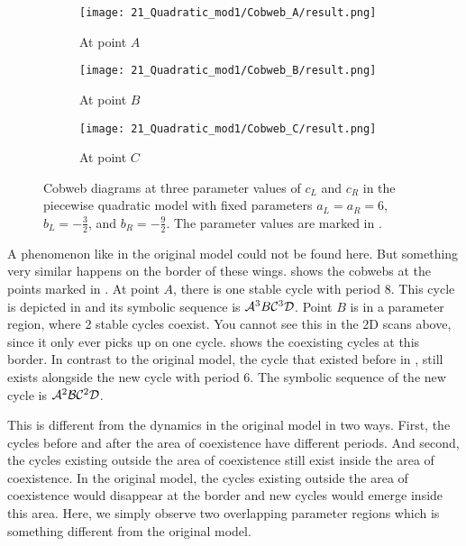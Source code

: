 \begin{figure}
	\centering
	\begin{subfigure}{0.3\textwidth}
		\centering
		\texttt{[image: 21\_Quadratic\_mod1/Cobweb\_A/result.png]}
		\caption{At point $A$}
		\label{fig:setup.quad.even.cobweb.A}
	\end{subfigure}
	\begin{subfigure}{0.3\textwidth}
		\centering
		\texttt{[image: 21\_Quadratic\_mod1/Cobweb\_B/result.png]}
		\caption{At point $B$}
		\label{fig:setup.quad.even.cobweb.B}
	\end{subfigure}
	\begin{subfigure}{0.3\textwidth}
		\centering
		\texttt{[image: 21\_Quadratic\_mod1/Cobweb\_C/result.png]}
		\caption{At point $C$}
		\label{fig:setup.quad.even.cobweb.C}
	\end{subfigure}
	\caption[Cobwebs of the even quadratic model]{
		Cobweb diagrams at three parameter values of $c_L$ and $c_R$ in the piecewise quadratic model with fixed parameters $a_L = a_R = 6$, $b_L = -\frac{3}{2}$, and $b_R = -\frac{9}{2}$.
		The parameter values are marked in .
	}
	\label{fig:setup.quad.even.cobwebs}
\end{figure}

A phenomenon like in the original model could not be found here.
But something very similar happens on the border of these wings.
 shows the cobwebs at the points marked in .
At point $A$, there is one stable cycle with period 8.
This cycle is depicted in  and its symbolic sequence is $\mathcal{A}^3B\mathcal{C}^3\mathcal{D}$.
Point $B$ is in a parameter region, where 2 stable cycles coexist.
You cannot see this in the 2D scans above, since it only ever picks up on one cycle.
 shows the coexisting cycles at this border.
In contrast to the original model, the cycle that existed before in , still exists alongside the new cycle with period 6.
The symbolic sequence of the new cycle is $\mathcal{A}^2\mathcal{B}\mathcal{C}^2\mathcal{D}$.


This is different from the dynamics in the original model in two ways.
First, the cycles before and after the area of coexistence have different periods.
And second, the cycles existing outside the area of coexistence still exist inside the area of coexistence.
In the original model, the cycles existing outside the area of coexistence would disappear at the border and new cycles would emerge inside this area.
Here, we simply observe two overlapping parameter regions which is something different from the original model.
